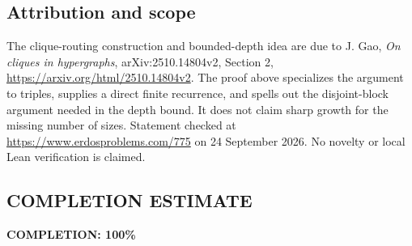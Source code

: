\subsection*{Attribution and scope}
The clique-routing construction and bounded-depth idea are due to J. Gao, \emph{On cliques in hypergraphs}, arXiv:2510.14804v2, Section 2, \url{https://arxiv.org/html/2510.14804v2}. The proof above specializes the argument to triples, supplies a direct finite recurrence, and spells out the disjoint-block argument needed in the depth bound. It does not claim sharp growth for the missing number of sizes. Statement checked at \url{https://www.erdosproblems.com/775} on 24 September 2026. No novelty or local Lean verification is claimed.
\subsection*{COMPLETION ESTIMATE}
\textbf{COMPLETION: 100\%}
